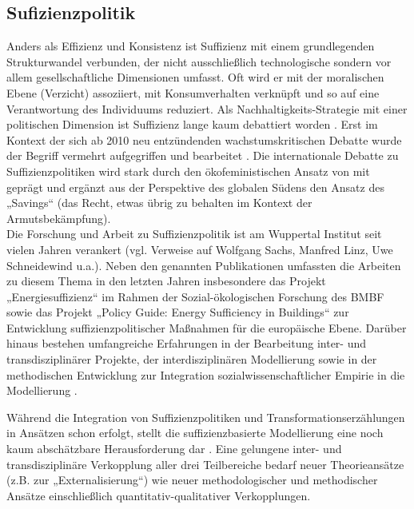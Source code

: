 \documentclass[a4paper,11pt,twoside]{scrartcl}
\begin{document}
\subsection*{Sufizienzpolitik}
Anders als Effizienz und Konsistenz ist Suffizienz mit einem grundlegenden Strukturwandel verbunden, der nicht ausschließlich technologische sondern vor allem gesellschaftliche Dimensionen umfasst. Oft wird er mit der moralischen Ebene (Verzicht) assoziiert, mit Konsumverhalten verknüpft und so auf eine Verantwortung des Individuums reduziert. Als Nachhaltigkeits-Strategie mit einer politischen Dimension ist Suffizienz lange kaum debattiert worden \cite{Winterfeld2002}. Erst im Kontext der sich ab 2010 neu entzündenden wachstumskritischen Debatte wurde der Begriff vermehrt aufgegriffen und bearbeitet \cite{Seidl2010,Raetz2011,Schneidewind2013,Winterfeld2017,Linz2015,Bierwirth2015,Thomas2015,Adler2017}. Die internationale Debatte zu Suffizienzpolitiken wird stark durch den ökofeministischen Ansatz von \cite{Salleh2009} mit geprägt und ergänzt aus der Perspektive des globalen Südens den Ansatz des „Savings“ (das Recht, etwas übrig zu behalten im Kontext der Armutsbekämpfung).\\
Die Forschung und Arbeit zu Suffizienzpolitik ist am Wuppertal Institut seit vielen Jahren verankert (vgl. Verweise auf Wolfgang Sachs, Manfred Linz, Uwe Schneidewind u.a.).
Neben den genannten Publikationen umfassten die Arbeiten zu diesem Thema in den letzten Jahren insbesondere das Projekt „Energiesuffizienz“ \cite{Brischke2016} im Rahmen der Sozial-ökologischen Forschung des BMBF sowie das Projekt „Policy Guide: Energy Sufficiency in Buildings“ \cite{EnergySufficiencyProjekt} zur Entwicklung suffizienzpolitischer Maßnahmen für die europäische Ebene. Darüber hinaus bestehen umfangreiche Erfahrungen in der Bearbeitung inter- und transdisziplinärer Projekte, der interdisziplinären Modellierung sowie in der methodischen Entwicklung zur Integration sozialwissenschaftlicher Empirie in die Modellierung \cite{Bierwirth2016}.

Während die Integration von Suffizienzpolitiken und Transformationserzählungen in Ansätzen schon erfolgt, stellt die suffizienzbasierte Modellierung eine noch kaum abschätzbare Herausforderung dar \cite{SAMADI2017}. Eine gelungene inter- und transdisziplinäre Verkopplung aller drei Teilbereiche bedarf neuer Theorieansätze (z.B. zur „Externalisierung“) wie neuer methodologischer und methodischer Ansätze einschließlich quantitativ-qualitativer Verkopplungen.
\end{document}
